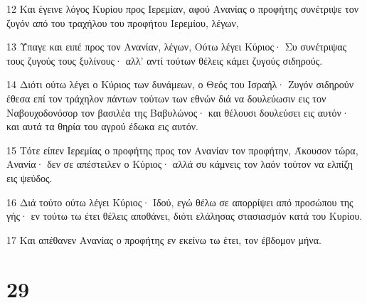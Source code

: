 \par 12 Και έγεινε λόγος Κυρίου προς Ιερεμίαν, αφού Ανανίας ο προφήτης συνέτριψε τον ζυγόν από του τραχήλου του προφήτου Ιερεμίου, λέγων,
\par 13 Ύπαγε και ειπέ προς τον Ανανίαν, λέγων, Ούτω λέγει Κύριος· Συ συνέτριψας τους ζυγούς τους ξυλίνους· αλλ' αντί τούτων θέλεις κάμει ζυγούς σιδηρούς.
\par 14 Διότι ούτω λέγει ο Κύριος των δυνάμεων, ο Θεός του Ισραήλ· Ζυγόν σιδηρούν έθεσα επί τον τράχηλον πάντων τούτων των εθνών διά να δουλεύωσιν εις τον Ναβουχοδονόσορ τον βασιλέα της Βαβυλώνος· και θέλουσι δουλεύσει εις αυτόν· και αυτά τα θηρία του αγρού έδωκα εις αυτόν.
\par 15 Τότε είπεν Ιερεμίας ο προφήτης προς τον Ανανίαν τον προφήτην, Άκουσον τώρα, Ανανία· δεν σε απέστειλεν ο Κύριος· αλλά συ κάμνεις τον λαόν τούτον να ελπίζη εις ψεύδος.
\par 16 Διά τούτο ούτω λέγει Κύριος· Ιδού, εγώ θέλω σε απορρίψει από προσώπου της γής· εν τούτω τω έτει θέλεις αποθάνει, διότι ελάλησας στασιασμόν κατά του Κυρίου.
\par 17 Και απέθανεν Ανανίας ο προφήτης εν εκείνω τω έτει, τον έβδομον μήνα.

\chapter{29}

